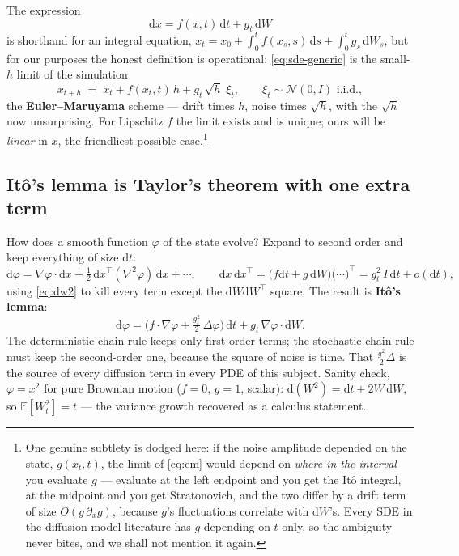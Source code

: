 \documentclass[10pt,a4paper]{article}
\newcommand{\E}{\mathbb{E}}
\newcommand{\dd}{\mathrm{d}}
\begin{document}
The expression
\begin{equation}
\dd x = f(x, t)\, \dd t + g_t\, \dd W
\label{eq:sde-generic}
\end{equation}
is shorthand for an integral equation,
$x_t = x_0 + \int_0^t f(x_s, s)\,\dd s + \int_0^t g_s\, \dd W_s$, but for
our purposes the honest definition is operational: \eqref{eq:sde-generic}
is the small-$h$ limit of the simulation
\begin{equation}
x_{t+h} \;=\; x_t + f(x_t, t)\, h + g_t\, \sqrt{h}\; \xi_t,
\qquad \xi_t \sim \mathcal{N}(0, I) \text{ i.i.d.},
\label{eq:em}
\end{equation}
the \textbf{Euler--Maruyama} scheme --- drift times $h$, noise times
$\sqrt{h}$, with the $\sqrt{h}$ now unsurprising. For Lipschitz $f$ the
limit exists and is unique; ours will be \emph{linear} in $x$, the
friendliest possible case.\footnote{One genuine subtlety is dodged here:
if the noise amplitude depended on the state, $g(x_t, t)$, the limit of
\eqref{eq:em} would depend on \emph{where in the interval} you evaluate
$g$ --- evaluate at the left endpoint and you get the It\^o integral,
at the midpoint and you get Stratonovich, and the two differ by a drift
term of size $O(g\,\partial_x g)$, because $g$'s fluctuations correlate
with $\dd W$'s. Every SDE in the diffusion-model literature has
$g$ depending on $t$ only, so the ambiguity never bites, and we shall
not mention it again.}

\subsection{It\^o's lemma is Taylor's theorem with one extra term}

How does a smooth function $\varphi$ of the state evolve? Expand to
second order and keep everything of size $\dd t$:
\begin{equation}
\dd \varphi
= \nabla\varphi \cdot \dd x
+ \tfrac12\, \dd x^\top (\nabla^2 \varphi)\, \dd x + \cdots,
\qquad
\dd x\, \dd x^\top = \big(f \dd t + g\, \dd W\big)\big(\cdots\big)^\top
= g_t^2\, I\, \dd t + o(\dd t),
\end{equation}
using \eqref{eq:dw2} to kill every term except the $\dd W \dd W^\top$
square. The result is \textbf{It\^o's lemma}:
\begin{equation}
\boxed{\;\dd \varphi
= \Big( f \cdot \nabla\varphi
+ \tfrac{g_t^2}{2}\, \Delta\varphi \Big)\, \dd t
+ g_t\, \nabla\varphi \cdot \dd W.\;}
\label{eq:ito}
\end{equation}
The deterministic chain rule keeps only first-order terms; the
stochastic chain rule must keep the second-order one, because the square
of noise is time. That $\tfrac{g^2}{2}\Delta$ is the source of every
diffusion term in every PDE of this subject. Sanity check, $\varphi = x^2$
for pure Brownian motion ($f = 0$, $g = 1$, scalar):
$\dd(W^2) = \dd t + 2W\,\dd W$, so $\E[W_t^2] = t$ --- the variance
growth recovered as a calculus statement.
\end{document}
